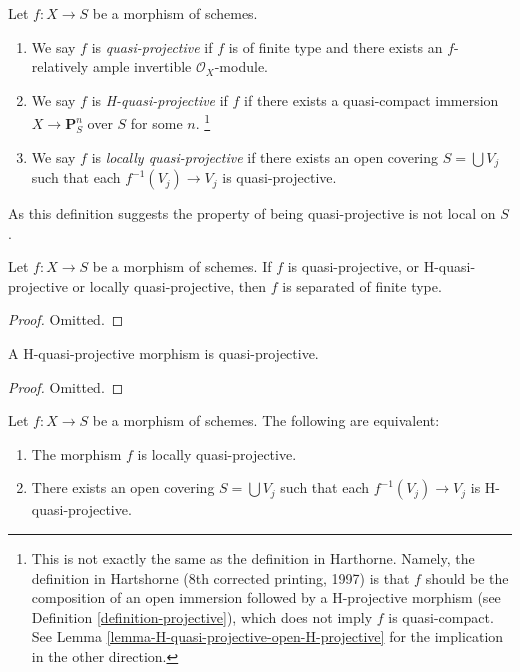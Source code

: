 \begin{definition}
\label{definition-quasi-projective}
Let $f : X \to S$ be a morphism of schemes.
\begin{enumerate}
\item We say $f$ is {\it quasi-projective} if $f$ is of finite type
and there exists an $f$-relatively ample invertible $\mathcal{O}_X$-module.
\item We say $f$ is {\it H-quasi-projective} if $f$ if there exists
a quasi-compact immersion $X \to \mathbf{P}^n_S$ over $S$ for some $n$.
\footnote{This is not exactly the same as the definition in Harthorne.
Namely, the definition in Hartshorne (8th corrected printing, 1997) is that
$f$ should be the composition of an open immersion followed by a H-projective
morphism (see Definition \ref{definition-projective}), which does not imply
$f$ is quasi-compact. See
Lemma \ref{lemma-H-quasi-projective-open-H-projective} for
the implication in the other direction.}
\item We say $f$ is {\it locally quasi-projective} if there exists
an open covering $S = \bigcup V_j$ such that each $f^{-1}(V_j) \to V_j$
is quasi-projective.
\end{enumerate}
\end{definition}

\noindent
As this definition suggests the property of being quasi-projective
is not local on $S$.

\begin{lemma}
\label{lemma-quasi-projective-properties}
Let $f : X \to S$ be a morphism of schemes. If $f$ is quasi-projective,
or H-quasi-projective or locally quasi-projective, then $f$ is
separated of finite type.
\end{lemma}

\begin{proof}
Omitted.
\end{proof}

\begin{lemma}
\label{lemma-H-quasi-projective-quasi-projective}
A H-quasi-projective morphism is quasi-projective.
\end{lemma}

\begin{proof}
Omitted.
\end{proof}

\begin{lemma}
\label{lemma-characterize-locally-quasi-projective}
Let $f : X \to S$ be a morphism of schemes.
The following are equivalent:
\begin{enumerate}
\item The morphism $f$ is locally quasi-projective.
\item There exists an open covering $S = \bigcup V_j$ such
that each $f^{-1}(V_j) \to V_j$ is H-quasi-projective.
\end{enumerate}
\end{lemma}

